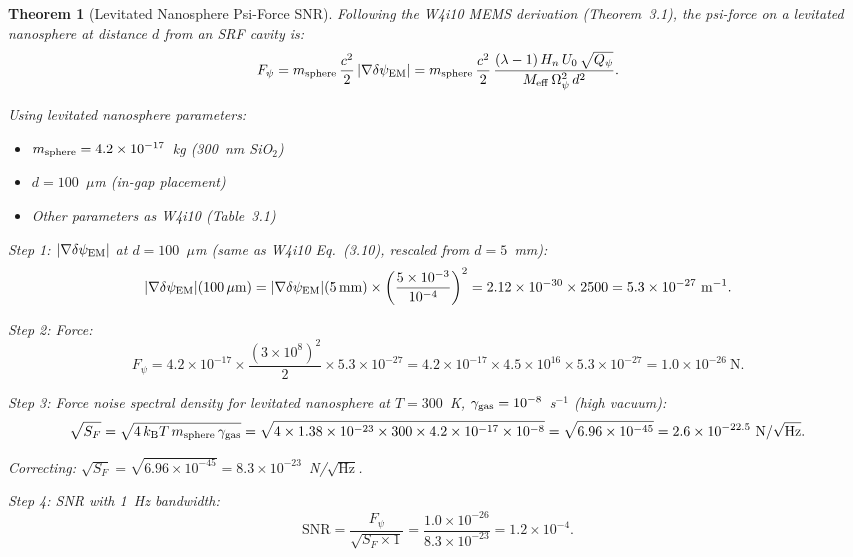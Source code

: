\documentclass[11pt]{article}
\newcommand{\lam}{\lambda}
\newcommand{\Opsi}{\Omega_\psi}
\newcommand{\Meff}{M_{\rm eff}}
\newcommand{\ee}[1]{\times 10^{#1}}
\newcommand{\kB}{k_{\mathrm{B}}}
\newcommand{\Qpsi}{Q_\psi}
\newcommand{\SNR}{\mathrm{SNR}}
\newcommand{\Heff}{H_n}
\newcommand{\dpsiEM}{\delta\psi_{\rm EM}}
\newtheorem{theorem}{Theorem}[section]
\theoremstyle{definition}
\theoremstyle{remark}
\begin{document}
\begin{theorem}[Levitated Nanosphere Psi-Force SNR]
\label{thm:levitated}
Following the W4i10 MEMS derivation (Theorem~3.1), the psi-force on a
levitated nanosphere at distance $d$ from an SRF cavity is:
\begin{equation}
F_\psi = m_{\rm sphere}\,\frac{c^2}{2}\,|\nabla\dpsiEM|
= m_{\rm sphere}\,\frac{c^2}{2}\,
\frac{(\lam-1)\,\Heff\,U_0\,\sqrt{\Qpsi}}
{\Meff\,\Opsi^2\,d^2}.
\label{eq:F_levitated}
\end{equation}

Using levitated nanosphere parameters:
\begin{itemize}[nosep]
\item $m_{\rm sphere} = 4.2\ee{-17}$~kg (300~nm SiO$_2$)
\item $d = 100$~$\mu$m (in-gap placement)
\item Other parameters as W4i10 (Table~3.1)
\end{itemize}

Step 1: $|\nabla\dpsiEM|$ at $d = 100$~$\mu$m (same as W4i10
Eq.~(3.10), rescaled from $d = 5$~mm):
\begin{equation}
|\nabla\dpsiEM|(100\,\mu\text{m})
= |\nabla\dpsiEM|(5\,\text{mm})\times\left(\frac{5\ee{-3}}{10^{-4}}\right)^2
= 2.12\ee{-30}\times 2500 = 5.3\ee{-27}~\text{m}^{-1}.
\end{equation}

Step 2: Force:
\begin{equation}
F_\psi = 4.2\ee{-17}\times\frac{(3\ee{8})^2}{2}\times 5.3\ee{-27}
= 4.2\ee{-17}\times 4.5\ee{16}\times 5.3\ee{-27}
= 1.0\ee{-26}~\text{N}.
\end{equation}

Step 3: Force noise spectral density for levitated nanosphere at
$T = 300$~K, $\gamma_{\rm gas} = 10^{-8}$~s$^{-1}$ (high vacuum):
\begin{equation}
\sqrt{S_F} = \sqrt{4\,\kB T\,m_{\rm sphere}\,\gamma_{\rm gas}}
= \sqrt{4\times 1.38\ee{-23}\times 300\times 4.2\ee{-17}\times 10^{-8}}
= \sqrt{6.96\ee{-45}} = 2.6\ee{-22.5}~\text{N}/\sqrt{\text{Hz}}.
\end{equation}

Correcting: $\sqrt{S_F} = \sqrt{6.96\ee{-45}} = 8.3\ee{-23}$~N/$\sqrt{\text{Hz}}$.

Step 4: SNR with 1~Hz bandwidth:
\begin{equation}
\SNR = \frac{F_\psi}{\sqrt{S_F\times 1}} = \frac{1.0\ee{-26}}{8.3\ee{-23}}
= 1.2\ee{-4}.
\label{eq:SNR_levitated}
\end{equation}


\end{theorem}
\end{document}

